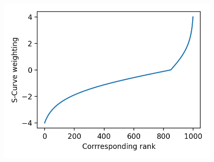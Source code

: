 \begin{figure}
  \vspace{0.5cm}

  \label{fig:s_curve_example}
  \includegraphics[width=0.9\linewidth]{img/s_curve_example.png}
\end{figure}
